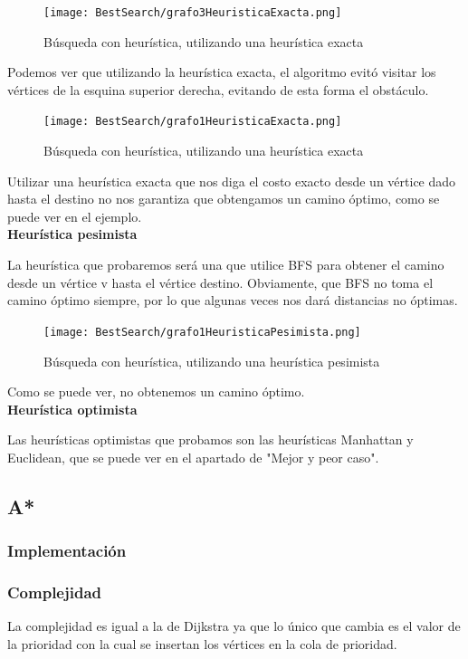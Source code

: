 \begin{figure}[H]
\centering
\texttt{[image: BestSearch/grafo3HeuristicaExacta.png]}
\caption{Búsqueda con heurística, utilizando una heurística exacta}
\end{figure}
Podemos ver que utilizando la heurística exacta, el algoritmo evitó visitar los vértices de la esquina superior derecha, evitando de esta forma el obstáculo.

\begin{figure}[H]
\centering
\texttt{[image: BestSearch/grafo1HeuristicaExacta.png]}
\caption{Búsqueda con heurística, utilizando una heurística exacta}
\end{figure}
Utilizar una heurística exacta que nos diga el costo exacto desde un vértice dado hasta el destino no nos garantiza que obtengamos un camino óptimo, como se puede ver en el ejemplo.
\\


\textbf{Heurística pesimista}

La heurística que probaremos será una que utilice BFS para obtener el camino desde un vértice v hasta el vértice destino. Obviamente, que BFS no toma el camino óptimo siempre, por lo que algunas veces nos dará distancias no óptimas.

\begin{figure}[H]
\centering
\texttt{[image: BestSearch/grafo1HeuristicaPesimista.png]}
\caption{Búsqueda con heurística, utilizando una heurística pesimista}
\end{figure}
Como se puede ver, no obtenemos un camino óptimo.
\\

\textbf{Heurística optimista}

Las heurísticas optimistas que probamos son las heurísticas Manhattan y Euclidean, que se puede ver en el apartado de "Mejor y peor caso".
\newpage

\subsection{A*}
\subsubsection{Implementación}

\subsubsection{Complejidad}
La complejidad es igual a la de Dijkstra ya que lo único que cambia es el valor de la prioridad con la cual se insertan los vértices en la cola de prioridad.

